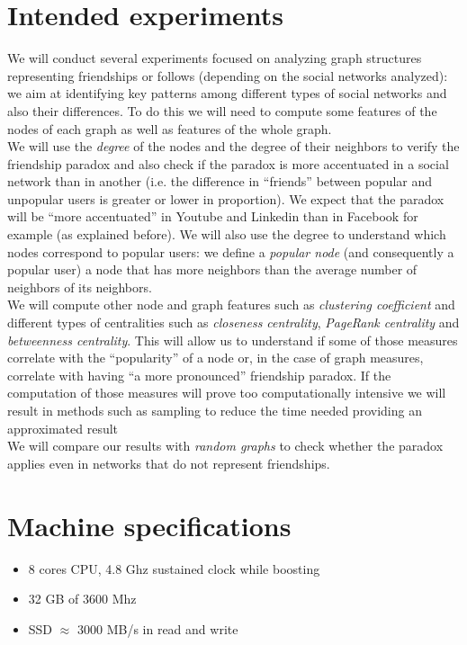 \documentclass{article}
\begin{document}
\section{Intended experiments}
We will conduct several experiments focused on analyzing graph structures representing friendships or follows (depending on the social networks analyzed): we aim at identifying key patterns among different types of social networks and also their differences. To do this we will need to compute some features of the nodes of each graph as well as features of the whole graph.\\
We will use the \textit{degree} of the nodes and the degree of their neighbors to verify the friendship paradox and also check if the paradox is more accentuated in a social network than in another (i.e. the difference in “friends” between popular and unpopular users is greater or lower in proportion). We expect that the paradox will be “more accentuated” in Youtube and Linkedin than in Facebook for example (as explained before). We will also use the degree to understand which nodes correspond to popular users: we define a \textit{popular node} (and consequently a popular user) a node that has more neighbors than the average number of neighbors of its neighbors.\\
We will compute other node and graph features such as \textit{clustering coefficient} and different types of centralities such as \textit{closeness centrality}, \textit{PageRank centrality} and \textit{betweenness centrality}. This will allow us to understand if some of those measures correlate with the “popularity” of a node or, in the case of graph measures, correlate with having “a more pronounced” friendship paradox. If the computation of those measures will prove too computationally intensive we will result in methods such as sampling to reduce the time needed providing an approximated result\\
We will compare our results with \textit{random graphs} to check whether the paradox applies even in networks that do not represent friendships.

\section{Machine specifications}
\begin{itemize}
    \item 8 cores CPU, 4.8 Ghz sustained clock while boosting
    \item 32 GB of 3600 Mhz 
    \item SSD $\approx$ 3000 MB/s in read and write
\end{itemize}
\end{document}
